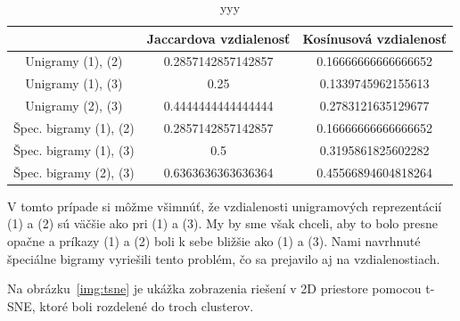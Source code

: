 \begin{table}[h]
	\centering
	\begin{tabular}{|c||c|c|} 
		\hline
		& Jaccardova vzdialenosť
		& Kosínusová vzdialenosť\\
		\hline
		Unigramy (1), (2) & 0.2857142857142857 & 0.16666666666666652\\
		\hline
		Unigramy (1), (3) & 0.25 & 0.1339745962155613\\
		\hline
		Unigramy (2), (3) & 0.4444444444444444 & 0.2783121635129677\\
		\Xhline{2pt}
		Špec. bigramy (1), (2) & 0.2857142857142857 & 0.16666666666666652\\
		\hline
		Špec. bigramy (1), (3) & 0.5 & 0.3195861825602282\\
		\hline
		Špec. bigramy (2), (3) & 0.6363636363636364 & 0.45566894604818264\\
		\hline
	\end{tabular}
	\caption[xxx]{yyy}
	\label{tab:distances2}
\end{table}

V tomto prípade si môžme všimnúť, že vzdialenosti unigramových reprezentácií
(1) a (2) sú väčšie ako pri (1) a (3). My by sme však chceli, aby to bolo presne opačne
a príkazy (1) a (2) boli k sebe bližšie ako (1) a (3). Nami navrhnuté špeciálne bigramy
vyriešili tento problém, čo sa prejavilo aj na vzdialenostiach.

Na obrázku~\ref{img:tsne} je ukážka zobrazenia riešení v 2D priestore pomocou
t-SNE, ktoré boli rozdelené do troch clusterov.

